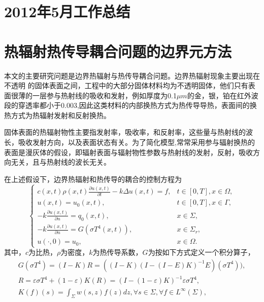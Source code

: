 
	
	\section{2012年5月工作总结}
	
\section{热辐射热传导耦合问题的边界元方法}

本文的主要研究问题是边界热辐射与热传导耦合问题。边界热辐射现象主要出现在不透明
的固体表面之间，工程中的大部分固体材料均为不透明固体，他们只有表面很薄的一层参与热射线的吸收和发射，例如厚度为0.1$\mu m$的金，银，铂在红外波段的穿透率都小于0.003\cite{yu2000},因此这类材料的内部换热方式为热传导导热，表面间的换热方式为热辐射发射和反射换热。

固体表面的热辐射物性主要指发射率，吸收率，和反射率，这些量与热射线的波长，吸收发射方向，以及表面状态有关\cite{yu2000}。为了简化模型,常常采用参与辐射换热的表面是漫灰体的假设，即辐射表面与辐射物性参数与热射线的发射，反射，吸收方向无关，且与热射线的波长无关。

在上述假设下，边界热辐射和热传导的耦合的控制方程为
\begin{equation}
	\begin{cases}
		 c(x,t) \rho(x,t) \frac{\partial u(x,t)}{\partial t} - k \Delta u(x,t) = f,              & t\in [0,T],x\in\Omega, \\
		u(x,t) = u_0(x,t),                          & t\in [0,T],x\in\Gamma,\\
		- k \frac{\partial u(x,t)}{\partial n} = q_0(x,t), & x \in  \Sigma,\\
		- k \frac{\partial u(x,t)}{\partial n} = G(\sigma T^4(x,t)) , &x \in \Sigma_r,\\
		u(\cdot,0)=u_0, & x \in \Omega.
		\end{cases}
	\label{eq:timedepand}
\end{equation}
其中，$c$为比热，$\rho$为密度，$k$为热传导系数，$G$为按如下方式定义一个积分算子\cite{druet2010weak}，
\begin{eqnarray}
	G(\sigma T^4) = (I-K)R=((I-K)(I-(I-E)K)^{-1}E)(\sigma T^4)),\label{eq:rbie} \\
	R = \varepsilon\sigma T^4 + (1-\varepsilon)K(R) = (I-(1-\varepsilon)K)^{-1}\varepsilon\sigma T^4, \\
	K(f)(s) = \int_{\Sigma}w(s,z)f(z)dz, \forall s \in \Sigma, \forall f \in L^{\infty}(\Sigma),
	\label{eqoperators}
\end{eqnarray}

